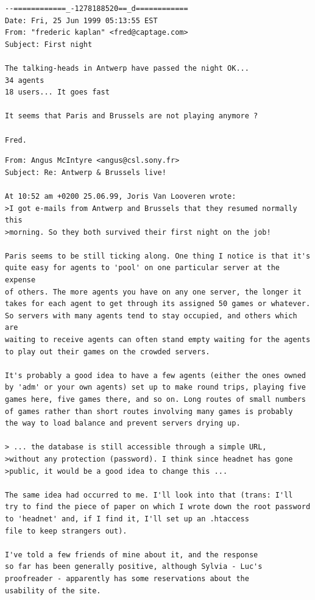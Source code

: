 \footnotesize{
\begin{verbatim}
--============_-1278188520==_d============
Date: Fri, 25 Jun 1999 05:13:55 EST
From: "frederic kaplan" <fred@captage.com>
Subject: First night

The talking-heads in Antwerp have passed the night OK... 
34 agents
18 users... It goes fast

It seems that Paris and Brussels are not playing anymore ?

Fred.
\end{verbatim}

\begin{verbatim}
From: Angus McIntyre <angus@csl.sony.fr>
Subject: Re: Antwerp & Brussels live!

At 10:52 am +0200 25.06.99, Joris Van Looveren wrote:
>I got e-mails from Antwerp and Brussels that they resumed normally this
>morning. So they both survived their first night on the job!

Paris seems to be still ticking along. One thing I notice is that it's 
quite easy for agents to 'pool' on one particular server at the expense 
of others. The more agents you have on any one server, the longer it 
takes for each agent to get through its assigned 50 games or whatever. 
So servers with many agents tend to stay occupied, and others which are 
waiting to receive agents can often stand empty waiting for the agents 
to play out their games on the crowded servers.

It's probably a good idea to have a few agents (either the ones owned 
by 'adm' or your own agents) set up to make round trips, playing five 
games here, five games there, and so on. Long routes of small numbers 
of games rather than short routes involving many games is probably 
the way to load balance and prevent servers drying up.

> ... the database is still accessible through a simple URL,
>without any protection (password). I think since headnet has gone
>public, it would be a good idea to change this ...

The same idea had occurred to me. I'll look into that (trans: I'll 
try to find the piece of paper on which I wrote down the root password 
to 'headnet' and, if I find it, I'll set up an .htaccess 
file to keep strangers out).

I've told a few friends of mine about it, and the response 
so far has been generally positive, although Sylvia - Luc's 
proofreader - apparently has some reservations about the 
usability of the site.


\end{verbatim}}
